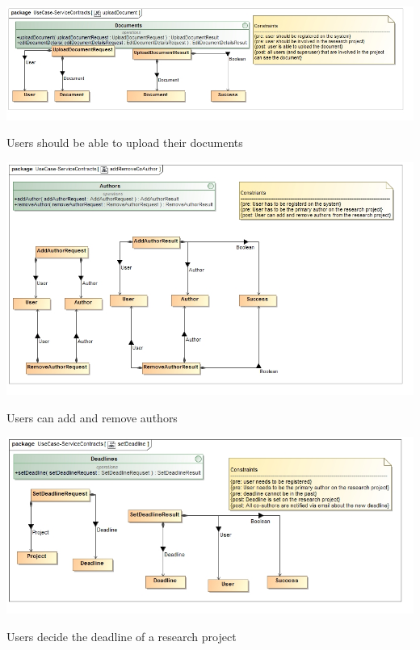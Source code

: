 \documentclass[a4paper,12pt]{report}
\begin{document}
\newpage

\begin{flushleft}
	\includegraphics[scale=0.5]{./images/class__uploadDocument.jpg}
	\begin{center}
		Users should be able to upload their documents
	\end{center}
\end{flushleft}

\begin{flushleft}
	\includegraphics[scale=0.5]{./images/class__addRemoveCoAuthor.jpg}
	\begin{center}
		Users can add and remove authors
	\end{center}
\end{flushleft}

\newpage

\begin{flushleft}
	\includegraphics[scale=0.5]{./images/class__setDeadline.jpg}
	\begin{center}
		Users decide the deadline of a research project
	\end{center}
\end{flushleft}
\end{document}
